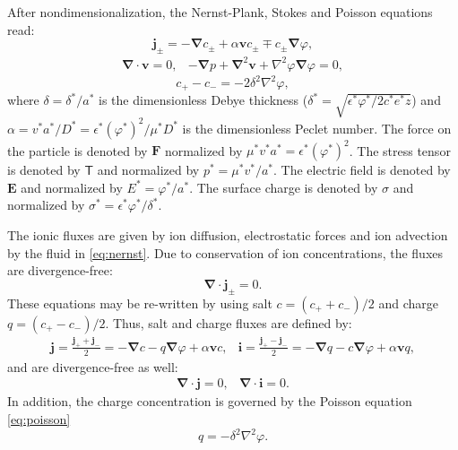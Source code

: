 \documentclass[MSc,beforeExam]{iitcsthesis}
\newcommand\eps \epsilon
\newcommand\Laplacian{\nabla^2}
\newcommand\bnabla{\boldsymbol{\nabla}}
\newcommand\bLaplacian{\boldsymbol{\nabla}^2}
\newcommand\bv{\boldsymbol{v}}
\newcommand\bE{\boldsymbol{E}}
\newcommand\bj{\boldsymbol{j}}
\newcommand\bi{\boldsymbol{i}}
\newcommand\bF{\boldsymbol{F}}
\newcommand\tT{\mathsf{T}}
\begin{document}
After nondimensionalization, the Nernst-Plank, Stokes and Poisson equations read:
\begin{equation} \label{eq:nernst}
\bj_\pm = 
-\bnabla c_\pm + \alpha \bv c_\pm \mp c_\pm \bnabla \varphi,
\end{equation}
\begin{equation} \label{eq:stokes}
\begin{array}{cc}
\bnabla \cdot \bv = 0, &
-\bnabla p + \bLaplacian \bv + \Laplacian \varphi \bnabla \varphi = 0, 
\end{array}
\end{equation}
\begin{equation} \label{eq:poisson}
c_+ - c_- = -2\delta^2 \Laplacian \varphi,
\end{equation}
where $\delta = {\delta^*}/{a^*}$ is the dimensionless Debye thickness 
($\delta^* = \sqrt{{\eps^* \varphi^*}/{2 c^* e^* z}}$) and 
$\alpha = {v^* a^*}/{D^*} = {\eps^* (\varphi^*)^2}/{\mu^* D^*}$ 
is the dimensionless Peclet number.
The force on the particle is denoted by $\bF$ normalized by $\mu^* v^* a^* = \eps^* (\varphi^*)^2$.
The stress tensor is denoted by $\tT$ and normalized by $p^* = \mu^* v^* / a^*$.
The electric field is denoted by $\bE$ and normalized by $E^* = \varphi^* / a^*$.
The surface charge is denoted by $\sigma$ and normalized by $\sigma^* = \eps^* \varphi^* / \delta^*$.

The ionic fluxes are given by ion diffusion, electrostatic forces and ion advection by the fluid
in \eqref{eq:nernst}. Due to conservation of ion concentrations, the fluxes are divergence-free:
\begin{equation*}
\bnabla \cdot \bj_\pm = 0.
\end{equation*}
These equations may be re-written by using salt $c = (c_+ + c_-)/2$ and charge $q = (c_+ - c_-)/2$.
Thus, salt and charge fluxes are defined by:
\begin{equation}\label{eq:fluxes}\begin{array}{cc}
  \bj = \frac{\bj_+ + \bj_-}{2} = -\bnabla c - q \bnabla \varphi + \alpha \bv c, & 
  \bi = \frac{\bj_+ - \bj_-}{2} = -\bnabla q - c \bnabla \varphi + \alpha \bv q,
\end{array}\end{equation}
and are divergence-free as well:
\begin{equation}\label{eq:zero_flux}\begin{array}{cc}
\bnabla \cdot \bj = 0, & 
\bnabla \cdot \bi = 0. 
\end{array}\end{equation}
In addition, the charge concentration is governed by the Poisson equation \eqref{eq:poisson}
\begin{equation}
q = -\delta^2 \Laplacian \varphi.
\end{equation}
\end{document}
